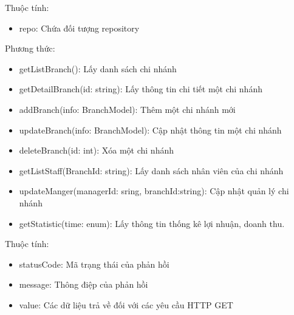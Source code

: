Thuộc tính:
\begin{itemize}
	\item repo: Chứa đối tượng repository
\end{itemize}
Phương thức:
\begin{itemize}
	\item getListBranch(): Lấy danh sách chi nhánh
	\item getDetailBranch(id: string): Lấy thông tin chi tiết một chi nhánh
	\item addBranch(info: BranchModel): Thêm một chi nhánh mới
	\item updateBranch(info: BranchModel): Cập nhật thông tin một chi nhánh
	\item deleteBranch(id: int): Xóa một chi nhánh
	\item getListStaff(BranchId: string): Lấy danh sách nhân viên của chi nhánh
	\item updateManger(managerId: sring, branchId:string): Cập nhật quản lý chi nhánh
	\item getStatistic(time: enum): Lấy thông tin thống kê lợi nhuận, doanh thu.
\end{itemize}

Thuộc tính:
\begin{itemize}
	\item statusCode: Mã trạng thái của phản hồi
	\item message: Thông điệp của phản hồi
	\item value: Các dữ liệu trả về đối với các yêu cầu HTTP GET
\end{itemize}



